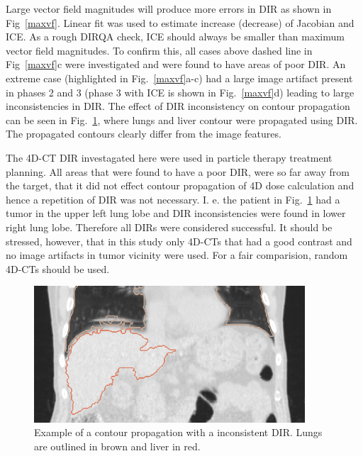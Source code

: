 \documentclass[type=dr, dr=rernat, accentcolor=tud7b,colorbacktitle, bigchapter, openright, twoside, 12pt ]{tudthesis}
\begin{document}
Large vector field magnitudes will produce more errors in DIR as shown in Fig~\ref{maxvf}. Linear fit was used to estimate increase (decrease) of Jacobian and ICE. 
As a rough DIRQA check, ICE should always be smaller than maximum vector field magnitudes. To confirm this, all cases above dashed line in Fig~\ref{maxvf}c 
were investigated and were found to have areas of poor DIR. An extreme case (highlighted in Fig.~\ref{maxvf}a-c)
had a large image artifact present in phases 2 and 3 (phase 3 with ICE is shown in Fig.~\ref{maxvf}d) leading to large inconsistencies in DIR. 
The effect of DIR inconsistency on contour propagation can be seen in Fig.~\ref{contourPropagation},
where lungs and liver contour were propagated using DIR. The propagated contours clearly differ from the image features.

The 4D-CT DIR investagated here were used in particle therapy treatment planning. All areas that were found to have a poor DIR, were so far away from the target, that it did not effect contour propagation of 4D dose calculation and
hence a repetition of DIR was not necessary.
I. e. the patient in Fig.~\ref{contourPropagation} had a tumor in the upper left lung lobe and DIR inconsistencies were found in lower right lung lobe. 
Therefore all DIRs were considered successful. It should be stressed, however, that in this study only 4D-CTs that had a good contrast and no image artifacts in tumor vicinity were used. For a 
fair comparision, random 4D-CTs should be used.

\begin{figure}[H]
	\begin{center}		
		\includegraphics[width=0.9\textwidth]{./Images/ContourPropagation/contourPropagation.png}
		\caption{Example of a contour propagation with a inconsistent DIR. Lungs are outlined in brown and liver in red.}
		\label{contourPropagation}
	\end{center}
\end{figure}
\end{document}
